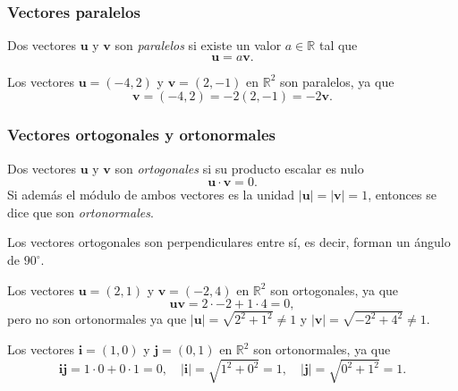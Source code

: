 \begin{frame}
	\frametitle{Vectores paralelos}
	\begin{definicion}
		Dos vectores $\mathbf{u}$ y $\mathbf{v}$ son \emph{paralelos} si existe un valor $a\in\mathbb{R}$ tal que
		\[
			\mathbf{u} = a\mathbf{v}.
		\]
	\end{definicion}
	
	Los vectores $\mathbf{u}=(-4,2)$ y $\mathbf{v}=(2,-1)$ en $\mathbb{R}^2$ son paralelos, ya que
	\[
		\mathbf{v}= (-4,2) = -2(2,-1) = -2\mathbf{v}.
	\]
	
\end{frame} 


\begin{frame}
	\frametitle{Vectores ortogonales y ortonormales}
	\begin{definicion}
		Dos vectores $\mathbf{u}$ y $\mathbf{v}$ son \emph{ortogonales} si su producto escalar es nulo
		\[
			\mathbf{u}\cdot \mathbf{v} = 0.
		\]
		Si además el módulo de ambos vectores es la unidad $|\mathbf{u}|=|\mathbf{v}|=1$, entonces se dice que son \emph{ortonormales}.
	\end{definicion}
	
	Los vectores ortogonales son perpendiculares entre sí, es decir, forman un ángulo de $90^\circ$.
	
	Los vectores $\mathbf{u}=(2,1)$ y $\mathbf{v}=(-2,4)$ en $\mathbb{R}^2$ son ortogonales, ya que
	\[
		\mathbf{u}\mathbf{v} = 2\cdot -2 +1\cdot 4 = 0,
	\]
	pero no son ortonormales ya que $|\mathbf{u}| = \sqrt{2^2+1^2} \neq 1$ y  $|\mathbf{v}| = \sqrt{-2^2+4^2} \neq 1$.
	
	Los vectores $\mathbf{i}=(1,0)$ y $\mathbf{j}=(0,1)$ en $\mathbb{R}^2$ son ortonormales, ya que
	\[
		\mathbf{i}\mathbf{j} = 1\cdot 0 +0\cdot 1 = 0, \quad |\mathbf{i}| = \sqrt{1^2+0^2} = 1,  \quad |\mathbf j| = \sqrt{0^2+1^2} = 1.
	\]
\end{frame}  



